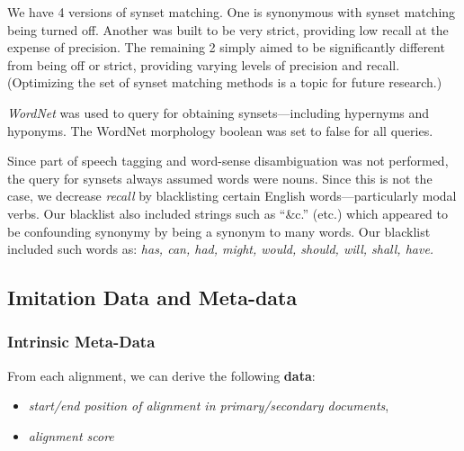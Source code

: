 We have 4 versions of synset matching. One is synonymous with synset matching being turned off. Another was built to be very strict, providing low recall at the expense of precision. The remaining 2 simply aimed to be significantly different from being off or strict, providing varying levels of precision and recall. (Optimizing the set of synset matching methods is a topic for future research.) %



\textit{WordNet} \cite{wordnet_1998} was used to query for obtaining synsets---including hypernyms and hyponyms. The WordNet morphology boolean was set to false for all queries. 

Since part of speech tagging and word-sense disambiguation was not performed, the query for synsets always assumed words were nouns. Since this is not the case, we decrease \textit{recall} by blacklisting certain English words---particularly modal verbs. Our blacklist also included strings such as ``\&c.'' (etc.) which appeared to be confounding synonymy by being a synonym to many words. Our blacklist included such words as: \textit{has, can, had, might, would, should, will, shall, have.}


\subsection{Imitation Data and Meta-data}

\subsubsection{Intrinsic Meta-Data}
From each alignment, we can derive the following \textbf{data}:
	\begin{itemize}
		\item \textit{start/end position of alignment in primary/secondary documents},
		\item \textit{alignment score}
	\end{itemize}

